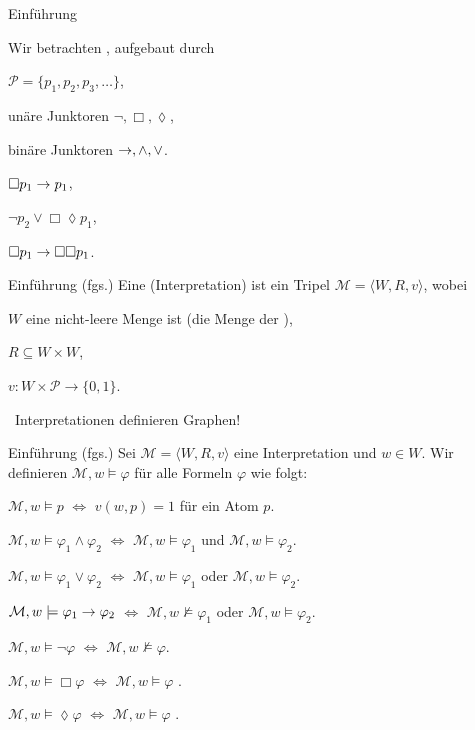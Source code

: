 \usetikzlibrary{arrows}

\begin{frame}{Einf\"uhrung}
\bi
\item Wir betrachten , aufgebaut durch 
\bi
	\item {} $\mathcal{P} = \{p_1,p_2,p_3,\ldots\}$,
	\item un\"are Junktoren $\neg, \Box, \lozenge$,
	\item bin\"are Junktoren $\rightarrow, \wedge, \vee$.
\ei
\ms
\item {} 
\bi
 \item $\Box p_1 \rightarrow p_1$, 
 \item $\neg p_2 \vee \Box\lozenge p_1$,
 \item $\Box p_1 \rightarrow \Box \Box p_1$.
\ei
\ei
\end{frame}

\begin{frame}{Einf\"uhrung (fgs.)}
Eine  (Interpretation) ist ein Tripel $\mathcal{M} = \langle W, R, v\rangle$, wobei\pause
\bi
	\item $W$ eine nicht-leere Menge ist (die Menge der ),\pause
	\item $R \subseteq W \times W$,\pause
	\item $v : W \times \mathcal{P} \rightarrow \{0,1\}$.
\ei

\bs
\pause

\ithand\ Interpretationen definieren Graphen!
\end{frame}

\begin{frame}{Einf\"uhrung (fgs.)}
Sei $\mathcal{M} = \langle W, R, v\rangle$ eine Interpretation und $w \in W$. Wir definieren $\mathcal{M}, w \models \varphi$ f\"ur alle Formeln $\varphi$ wie folgt:
\bi
	\item $\mathcal{M}, w \models p$ $\iff$ $v(w,p) = 1$ f\"ur ein Atom $p$.
	\item $\mathcal{M}, w \models \varphi_1 \wedge \varphi_2$ $\iff$ $\mathcal{M}, w \models \varphi_1$ und $\mathcal{M}, w \models \varphi_2$.
	\item $\mathcal{M}, w \models \varphi_1 \vee \varphi_2$ $\iff$ $\mathcal{M}, w \models \varphi_1$ oder $\mathcal{M}, w \models \varphi_2$.
	\item $\mathcal{M}, w \models \varphi_1 \rightarrow \varphi_2$ $\iff$ $\mathcal{M}, w \not\models \varphi_1$ oder $\mathcal{M}, w \models \varphi_2$.
	\item $\mathcal{M}, w \models \neg\varphi$ $\iff$ $\mathcal{M}, w \not\models \varphi$.
	\item $\mathcal{M}, w \models \Box\varphi$ $\iff$ $\mathcal{M}, w \models \varphi$ .
	\item $\mathcal{M}, w \models \lozenge\varphi$ $\iff$ $\mathcal{M}, w \models \varphi$ .
	
\ei
\end{frame}

